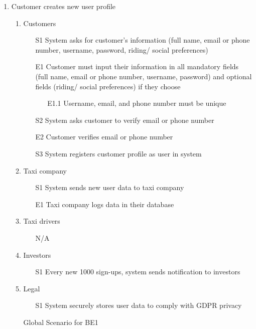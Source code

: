 \documentclass[]{article}
\begin{document}
\begin{enumerate}[{BE}1.]
	\item Customer creates new user profile
	\begin{enumerate}[{VP1}.1]
		\item Customers
			\begin{enumerate}
				\item[S1] System asks for customer’s information (full name, email or phone number, username, password, riding/ social preferences)
				\item[E1] Customer must input their information in all mandatory fields (full name, email or phone number, username, password) and optional fields (riding/ social preferences) if they choose
				\begin{enumerate}
					\item[E1.1] Username, email, and phone number must be unique
				\end{enumerate}
				\item[S2] System asks customer to verify email or phone number
				\item[E2] Customer verifies email or phone number
				\item[S3] System registers customer profile as user in system
			\end{enumerate}
		\item Taxi company
			\begin{enumerate}
				\item[S1] System sends new user data to taxi company
				\item[E1] Taxi company logs data in their database
			\end{enumerate}
		\item Taxi drivers
			\begin{enumerate}
				\item[N/A]
			\end{enumerate}
		\item Investors
			\begin{enumerate}
				\item[S1] Every new 1000 sign-ups, system sends notification to investors
			\end{enumerate}
		\item Legal
			\begin{enumerate}
				\item[S1] System securely stores user data to comply with GDPR privacy
			\end{enumerate}
		\item[Global] Scenario for BE1

\end{enumerate}
\end{enumerate}
\end{document}
